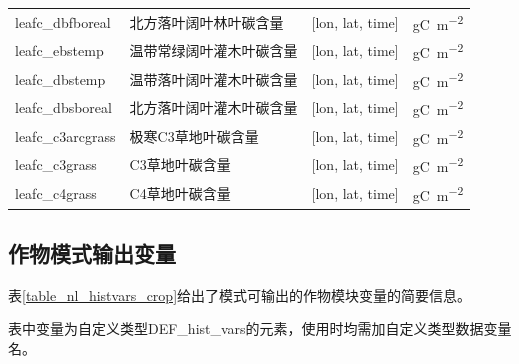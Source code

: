 \documentclass[a4paper,12pt,twoside]{article}
\begin{document}
{\begin{longtable}[htbp]{lp{}ll}
leafc\_dbfboreal & 北方落叶阔叶林叶碳含量 & {[}lon, lat, time{]} & \unit{gC.m^{-2}} \\
leafc\_ebstemp & 温带常绿阔叶灌木叶碳含量 & {[}lon, lat, time{]} & \unit{gC.m^{-2}} \\
leafc\_dbstemp & 温带落叶阔叶灌木叶碳含量 & {[}lon, lat, time{]} & \unit{gC.m^{-2}} \\
leafc\_dbsboreal & 北方落叶阔叶灌木叶碳含量 & {[}lon, lat, time{]} & \unit{gC.m^{-2}} \\
leafc\_c3arcgrass & 极寒C3草地叶碳含量 & {[}lon, lat, time{]} & \unit{gC.m^{-2}} \\
leafc\_c3grass & C3草地叶碳含量 & {[}lon, lat, time{]} & \unit{gC.m^{-2}} \\
leafc\_c4grass & C4草地叶碳含量 & {[}lon, lat, time{]} & \unit{gC.m^{-2}} \\
\end{longtable}}

\subsection{作物模式输出变量}\label{sec_hist_vars_crop}

表\ref{table_nl_histvars_crop}给出了模式可输出的作物模块变量的简要信息。\par
表中变量为自定义类型DEF\_hist\_vars的元素，使用时均需加自定义类型数据变量名。
\end{document}
